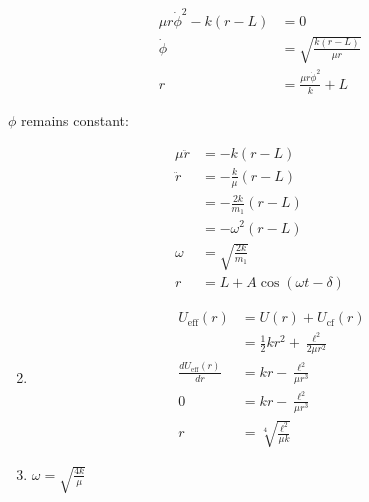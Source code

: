 \documentclass{article}
\begin{document}
\begin{enumerate}
        \begin{align*}
          \mu r \dot{\phi}^2 - k (r - L) & = 0                                \\
          \dot{\phi}                     & = \sqrt{\frac{k (r - L)}{\mu r}}   \\
          r                              & = \frac{\mu r \dot{\phi}^2}{k} + L
        \end{align*}

        $\phi$ remains constant:

        \begin{align*}
          \mu \ddot{r} & = -k (r - L)                     \\
          \ddot{r}     & = -\frac{k}{\mu} (r - L)         \\
                       & = -\frac{2 k}{m_1} (r - L)       \\
                       & = -\omega^2 (r - L)              \\
          \omega       & = \sqrt{\frac{2 k}{m_1}}         \\
          r            & = L + A \cos (\omega t - \delta)
        \end{align*}
\end{enumerate}

\begin{enumerate}
  \setcounter{enumi}{1}
  \item

        \begin{align*}
          U_\text{eff}(r)               & = U(r) + U_\text{cf}(r)                        \\
                                        & = \frac{1}{2} k r^2 + \frac{\ell^2}{2 \mu r^2} \\
          \frac{d U_\text{eff}(r)}{d r} & = k r - \frac{\ell^2}{\mu r^3}                 \\
          0                             & = k r - \frac{\ell^2}{\mu r^3}                 \\
          r                             & = \sqrt[4]{\frac{\ell^2}{\mu k}}
        \end{align*}

  \item $\omega = \sqrt{\frac{4 k}{\mu}}$
\end{enumerate}

\setcounter{subsection}{14}
\subsection{}
\end{document}
